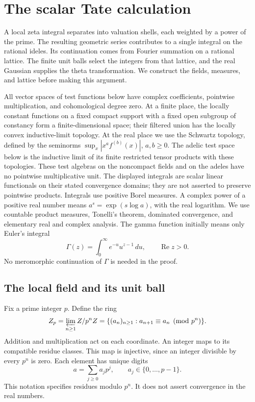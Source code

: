 \section{The scalar Tate calculation}
\label{sec:arithmetic-tate}

A local zeta integral separates into valuation shells, each weighted by
a power of the prime. The resulting geometric series contributes to a
single integral on the rational ideles. Its continuation comes from
Fourier summation on a rational lattice. The finite unit balls
select the integers from that lattice, and the real Gaussian supplies the
theta transformation. We construct the fields, measures, and lattice before
making this argument.

All vector spaces of test functions below have complex coefficients,
pointwise multiplication, and cohomological degree zero. At a finite place,
the locally constant functions on a fixed compact support with a fixed
open subgroup of constancy form a finite-dimensional space; their filtered
union has the locally convex inductive-limit topology. At the real place
we use the Schwartz topology, defined by the seminorms
\(\sup_x|x^a f^{(b)}(x)|\), \(a,b\geq0\).
The adelic test space below is the inductive limit of its finite restricted
tensor products with these topologies. These test algebras on the
noncompact fields and on the adeles have no pointwise multiplicative unit. The displayed integrals are scalar
linear functionals on their stated convergence domains; they are not
asserted to preserve pointwise products.
Integrals use positive Borel measures. A complex power of a positive real
number means \(a^s=\exp(s\log a)\), with the real logarithm.
We use countable product measures, Tonelli's theorem, dominated convergence,
and elementary real and complex analysis. The gamma function initially means
only Euler's integral
\[
 \Gamma(z)=\int_0^\infty e^{-u}u^{z-1}\,du,
 \qquad \operatorname{Re}z>0.
\]
No meromorphic continuation of \(\Gamma\) is needed in the proof.

\subsection{The local field and its unit ball}
\label{sec:adeles-local-field}

Fix a prime integer \(p\). Define the ring
\[
 \mathbb Z_p=\varprojlim_{n\geq1}\mathbb Z/p^n\mathbb Z
 =\{(a_n)_{n\geq1}:a_{n+1}\equiv a_n\pmod{p^n}\}.
\]
Addition and multiplication act on each coordinate. An integer maps to its
compatible residue classes. This map is injective, since an integer divisible
by every \(p^n\) is zero. Each element has unique digits
\[
 a=\sum_{j\geq0}a_jp^j,\qquad a_j\in\{0,\ldots,p-1\}.
\]
This notation specifies residues modulo \(p^n\). It does not assert
convergence in the real numbers.

